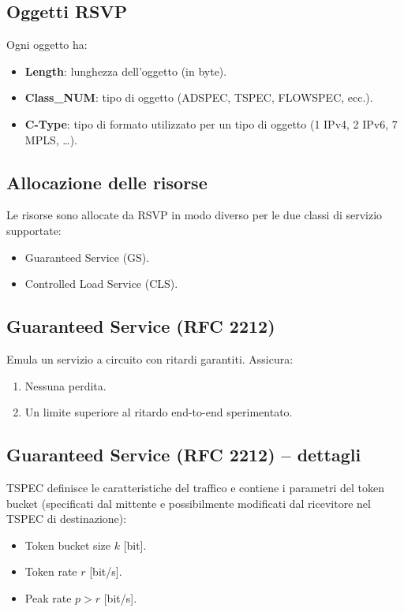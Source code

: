 \subsection{Oggetti RSVP}
Ogni oggetto ha:
\begin{itemize}
	\item \textbf{Length}: lunghezza dell'oggetto (in byte).
	\item \textbf{Class\_NUM}: tipo di oggetto (ADSPEC, TSPEC, FLOWSPEC, ecc.).
	\item \textbf{C-Type}: tipo di formato utilizzato per un tipo di oggetto (1 IPv4, 2 IPv6, 7 MPLS, \ldots).
\end{itemize}

\subsection{Allocazione delle risorse}
Le risorse sono allocate da RSVP in modo diverso per le due classi di servizio supportate:
\begin{itemize}
	\item Guaranteed Service (GS).
	\item Controlled Load Service (CLS).
\end{itemize}

\subsection{Guaranteed Service (RFC 2212)}
Emula un servizio a circuito con ritardi garantiti. Assicura:
\begin{enumerate}
	\item Nessuna perdita.
	\item Un limite superiore al ritardo end-to-end sperimentato.
\end{enumerate}

\subsection{Guaranteed Service (RFC 2212) – dettagli}
TSPEC definisce le caratteristiche del traffico e contiene i parametri del token bucket (specificati dal mittente e possibilmente modificati dal ricevitore nel TSPEC di destinazione):
\begin{itemize}
	\item Token bucket size $k$ [bit].
	\item Token rate $r$ [bit/s].
	\item Peak rate $p > r$ [bit/s].
\end{itemize}

